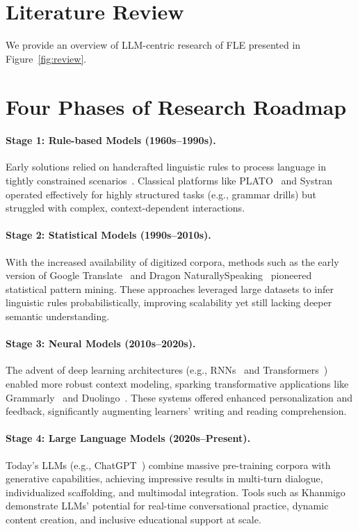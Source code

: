 \newpage
\appendix
\onecolumn
\section{Literature Review}\label{app:review}
We provide an overview of LLM-centric research of FLE presented in Figure~\ref{fig:review}.


\section{Four Phases of Research Roadmap}\label{app:roadmap}
\paragraph{Stage 1: Rule-based Models (1960s--1990s).} Early solutions relied on handcrafted linguistic rules to process language in tightly constrained scenarios~\cite{grosan2011rule,c1993towards}. Classical platforms like PLATO~\cite{hart1981language} and Systran~\cite{toma1977systran} operated effectively for highly structured tasks (e.g., grammar drills) but struggled with complex, context-dependent interactions.

\paragraph{Stage 2: Statistical Models (1990s--2010s).} With the increased availability of digitized corpora, methods such as the early version of Google Translate~\cite{och2006statistical} and Dragon NaturallySpeaking~\cite{blair1997dragon} pioneered statistical pattern mining. These approaches leveraged large datasets to infer linguistic rules probabilistically, improving scalability yet still lacking deeper semantic understanding.

\paragraph{Stage 3: Neural Models (2010s--2020s).} The advent of deep learning architectures (e.g., RNNs~\cite{yu2019review} and Transformers~\cite{vaswani2017attention}) enabled more robust context modeling, sparking transformative applications like Grammarly~\cite{fitria2021grammarly} and Duolingo~\cite{vesselinov2012duolingo}. These systems offered enhanced personalization and feedback, significantly augmenting learners’ writing and reading comprehension.

\paragraph{Stage 4: Large Language Models (2020s--Present).} Today’s LLMs (e.g., ChatGPT~\cite{achiam2023gpt}) combine massive pre-training corpora with generative capabilities, achieving impressive results in multi-turn dialogue, individualized scaffolding, and multimodal integration. Tools such as Khanmigo~\cite{anand2023khan} demonstrate LLMs’ potential for real-time conversational practice, dynamic content creation, and inclusive educational support at scale.

